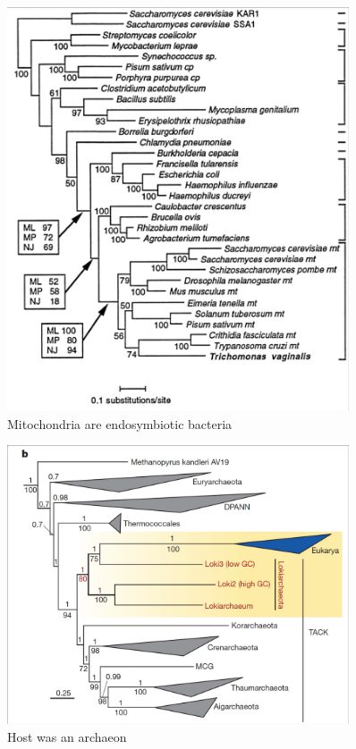 \documentclass[]{article}
\begin{document}
\begin{figure}[H]
	\caption{Mitochondria are endosymbiotic bacteria}
	\label{fig:Mitochondria:are:endosymbiotic:bacteria}
	\includegraphics[width=0.9\textwidth]{MitochondriaEndosymbiotic}
\end{figure}

\begin{figure}[H]
	\caption{Host was an archaeon}
	\label{fig:host:archaeon}
	\includegraphics[width=0.9\textwidth]{HostArchaeon}
\end{figure}
\end{document}
